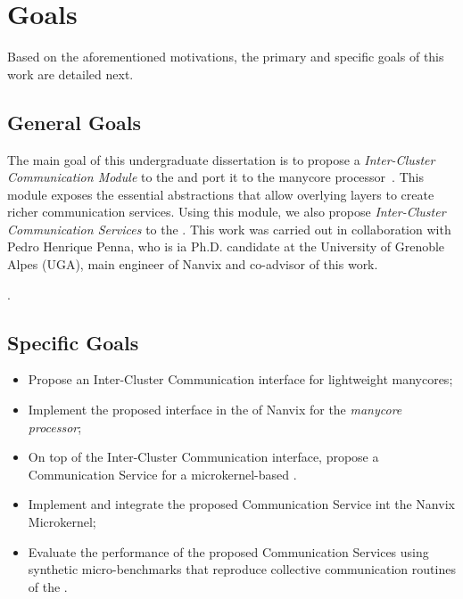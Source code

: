 \section{Goals}
\label{sec.goals}

	Based on the aforementioned motivations, the primary and specific
	goals of this work are detailed next.

\subsection{General Goals}
\label{sec.goals.general}

	The main goal of this undergraduate dissertation is to propose a
	\textit{Inter-Cluster Communication Module} to the \nanvix
	\textit{\hal} and port it to the \mppa manycore
	processor~\cite{DeDinechin2013-1}.  This module exposes the
	essential abstractions that allow overlying layers to create richer
	communication services.  Using this module, we also
	propose \textit{Inter-Cluster Communication Services} to the \nanvix
	\microkernel.  This work was carried out in collaboration with Pedro
	Henrique Penna, who is ia Ph.D. candidate at the University of
	Grenoble Alpes (UGA), main engineer of Nanvix and co-advisor of this
	work.

	.

\subsection{Specific Goals}
\label{sec.goals.specific}

	\begin{itemize}
		\item Propose an Inter-Cluster Communication interface for
		lightweight manycores;
		
		\item Implement the proposed interface in the \hal of Nanvix
		for the \textit{\mppa manycore processor};
		
		\item On top of the Inter-Cluster Communication interface,
		propose a Communication Service for a microkernel-based \os.
		
		\item Implement and integrate the proposed Communication Service
		int the Nanvix Microkernel;

		\item Evaluate the performance of the proposed Communication
		Services using synthetic micro-benchmarks that reproduce
		collective communication routines of the \mpi.
	\end{itemize}


